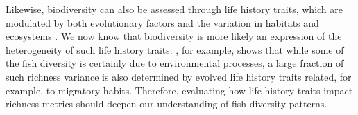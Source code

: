 \documentclass[12pt,authoryear]{elsarticle}
\begin{document}

Likewise, biodiversity can also be assessed through life history traits, which are modulated by both evolutionary factors and the variation in habitats and ecosystems \citep{neigel_book_1997, hutchings2005measuring}. We now know that biodiversity is more likely an expression of the heterogeneity of such life history traits. \citealt{alo2021macroecology}, for example, shows that while some of the fish diversity is certainly due to environmental processes, a large fraction of such richness variance is also determined by evolved life history traits related, for example, to migratory habits. Therefore, evaluating how life history traits impact richness metrics should deepen our understanding of fish diversity patterns.
\end{document}

